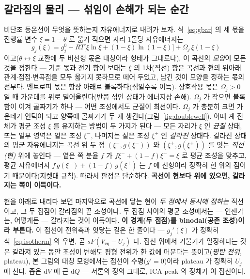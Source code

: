 \documentclass[11pt,a4paper]{article}
\newcommand{\dd}{\mathrm{d}}
\newcommand{\eq}{\mathrm{eq}}
\begin{document}
\subsection{갈라짐의 물리 — 섞임이 손해가 되는 순간}
비단조 등온선이 무엇을 뜻하는지 자유에너지로 내려가 보자. 식~\eqref{eq:gbar} 의 세 몫을 진행률
변수 $\xi=1-\theta$ 로 옮겨 적으면 자리 1몰당 자유에너지는
\begin{equation}
g_j(\xi)=g_j^0+RT\big[\xi\ln\xi+(1-\xi)\ln(1-\xi)\big]+\Omega_j\,\xi(1-\xi)
\label{eq:gxi}
\end{equation}
이고($\theta\leftrightarrow\xi$ 교환에 두 비선형 몫은 대칭이라 형태가 그대로다), 이 곡선의
\emph{모양}이 모든 것을 정한다 — 기준 몫과 전기 항이 보태는 $\xi$ 의 1차(직선) 항은 곡선과 현의
위아래 관계$\cdot$접점$\cdot$변곡점을 모두 옮기지 못하므로 떼어 두었고, 남긴 것이 모양을 정하는 몫의
전부다. 엔트로피 몫은 항상 아래로 볼록하다(섞일수록 이득). 상호작용 몫은
$\Omega_j>0$ 일 때 가운데를 위로 밀어올린다(반쯤 섞인 상태가 에너지상 손해). $\Omega_j$ 가 작으면 볼록함이
이겨 골짜기가 하나 — 어떤 조성에서도 균질이 최선이다. $\Omega_j$ 가 충분히 크면 가운데가 언덕이 되고 양쪽에
골짜기가 두 개 생긴다(그림~\ref{fig:doublewell}). 이때 계 전체가 평균 조성 $\xi$ 를 유지하는 방법이 두
가지가 된다 — 모든 자리가 $\xi$ 인 \emph{균질} 상태, 또는 일부 영역은 옅은 조성 $\xi^-$, 나머지는 짙은
조성 $\xi^+$ 인 \emph{갈라진} 상태다. 갈라진 상태의 평균 자유에너지는 곡선 위 두 점 $(\xi^-,g(\xi^-))$
와 $(\xi^+,g(\xi^+))$ 를 잇는 \emph{직선(현)} 위에 놓인다 — 옅은 쪽 분율 $f$ 가
$f\xi^-+(1-f)\xi^+=\xi$ 로 평균 조성을 맞추고, 평균 자유에너지 $f\,g(\xi^-)+(1-f)\,g(\xi^+)$ 는
$f$ 에 선형이라 정확히 현 위의 점이기 때문이다(지렛대 규칙). 따라서 판정은 단순하다. \textbf{곡선이 현보다 위에 있으면, 갈라지는 쪽이
이득이다.}

현을 아래로 내리다 보면 마지막으로 곡선에 닿는 현이 \emph{두 점에서 동시에 접하는} 직선이고, 그 두
접점이 갈라짐의 끝 조성이다. 두
접점 사이의 평균 조성에서는 — 언젠가는, 어떻게든 — 갈라지는 것이 이득이다. \textbf{이 경계(두 접점)를
binodal(공존 조성)이라 부른다.} 이 접선이 전위축과 잇닿는 길은 한 줄이다 — $g_j'(\xi)$ 가 정확히
식~\eqref{eq:isotherm} 의 우변, 곧 $sF(V_{\eq}-U_j)$ 다. 접선 위에서 기울기가 일정하다는 것은 갈라져
있는 동안 조성이 변해도 평형 전위가 한 값에 머문다는 뜻이고(\emph{평탄 전위}, plateau), 본 그림의 대칭
모형에서는 접선이 수평($g'=0$)이라 plateau 가 정확히 $U_j$ 에 선다. 좁은 $\dd V$ 에 큰 $\dd Q$ —
서론의 정의 그대로, ICA peak 의 정체가 이 접선이다.
\end{document}
